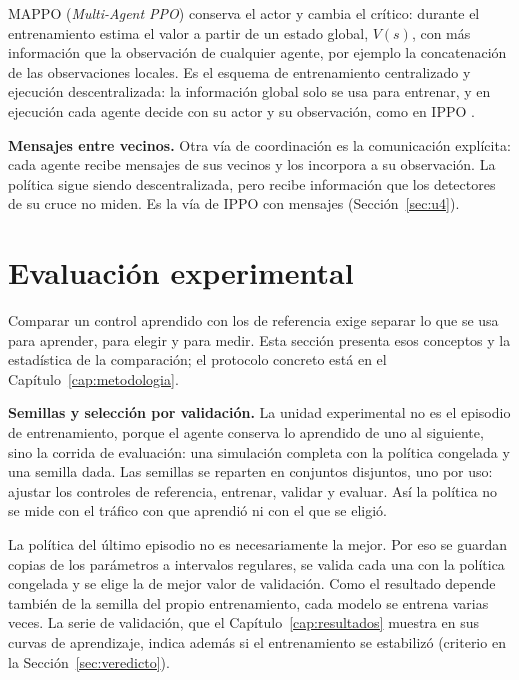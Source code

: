 MAPPO (\textit{Multi-Agent PPO}) conserva el actor y cambia el crítico: durante el entrenamiento
estima el valor a partir de un estado global, $V(s)$, con más información que la observación de
cualquier agente, por ejemplo la concatenación de las observaciones locales. Es el esquema de
entrenamiento centralizado y ejecución descentralizada: la información global solo se usa para
entrenar, y en ejecución cada agente decide con su actor y su observación, como en IPPO
\citep{Yu2021_MAPPO}.

\noindent\textbf{Mensajes entre vecinos.} Otra vía de coordinación es la comunicación explícita:
cada agente recibe mensajes de sus vecinos y los incorpora a su observación. La política sigue
siendo descentralizada, pero recibe información que los detectores de su cruce no miden. Es la vía
de IPPO con mensajes (Sección~\ref{sec:u4}).

\section{Evaluación experimental}
\label{sec:evaluacion}

Comparar un control aprendido con los de referencia exige separar lo que se usa para aprender,
para elegir y para medir. Esta sección presenta esos conceptos y la estadística de la comparación;
el protocolo concreto está en el Capítulo~\ref{cap:metodologia}.

\noindent\textbf{Semillas y selección por validación.} La unidad experimental no es el episodio de
entrenamiento, porque el agente conserva lo aprendido de uno al siguiente, sino la corrida de
evaluación: una simulación completa con la política congelada y una semilla dada. Las semillas se
reparten en conjuntos disjuntos, uno por uso: ajustar los controles de referencia, entrenar,
validar y evaluar. Así la política no se mide con el tráfico con que aprendió ni con el que se
eligió.

La política del último episodio no es necesariamente la mejor. Por eso se guardan copias de los
parámetros a intervalos regulares, se valida cada una con la política congelada y se elige la de
mejor valor de validación. Como el resultado depende también de la semilla del propio
entrenamiento, cada modelo se entrena varias veces. La serie de validación, que el
Capítulo~\ref{cap:resultados} muestra en sus curvas de aprendizaje, indica además si el
entrenamiento se estabilizó (criterio en la Sección~\ref{sec:veredicto}).

